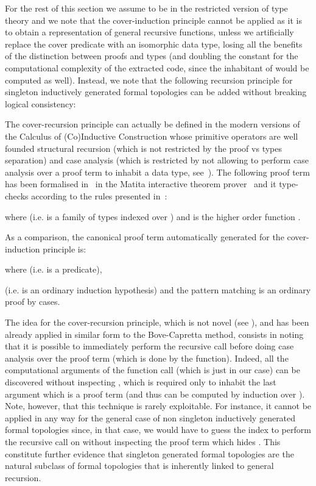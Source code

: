\documentclass[copyright,creativecommons]{eptcs}
\begin{document}
For the rest of this section we assume to be in the restricted version of type
theory and we note that the cover-induction principle cannot be applied as it
is to obtain a representation of general recursive functions, unless we
artificially replace the cover predicate 
with an isomorphic data type, losing all the benefits of the distinction
between proofs and types (and doubling the constant for the computational
complexity of the extracted code, since the inhabitant of
 would be computed as well).
Instead, we note that the following recursion
principle for singleton inductively generated formal topologies can be added
without breaking logical consistency:



The cover-recursion principle can actually be defined in the modern versions
of the Calculus of (Co)Inductive Construction whose primitive operators are
well founded structural recursion (which is not restricted by the proof vs
types separation) and case analysis (which is restricted by not allowing to
perform case analysis over a proof term to inhabit a data type,
see~\cite{Coq8.2}). The following proof term has been formalised in~\cite{Sac10}
in the Matita interactive theorem prover~\cite{ASTZ07} and it type-checks
according to the rules presented in~\cite{ARST09}:


where  (i.e.  is a family of types indexed over )
and  is the higher order function .

As a comparison, the canonical proof term automatically generated for the
cover-induction principle is:

where  (i.e.  is a predicate),

(i.e.  is an ordinary induction hypothesis) and the pattern matching
is an ordinary proof by cases.

The idea for the cover-recursion principle, which is not novel (see \cite{BC04}),
and has been already applied in similar form
to the Bove-Capretta method, consists in noting that it is possible to
immediately perform the recursive call before doing case analysis over the
proof term  (which is done by the  function). Indeed, all the
computational arguments of the function call (which is just  in our case) can
be discovered without inspecting , which is required only to inhabit the last
argument which is a proof term (and thus can be computed by induction over ).
Note, however, that this technique is rarely exploitable. For instance, it
cannot be applied in any way for the general case of non singleton inductively
generated formal topologies since, in that case, we would have to guess the
index  to perform the recursive call on without inspecting the
proof term  which hides . This constitute further evidence that singleton
generated formal topologies are the natural subclass of formal topologies
that is inherently linked to general recursion.
\end{document}
